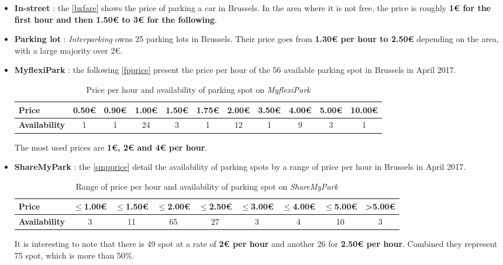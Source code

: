 \documentclass[12pt,a4paper,oneside]{book}
\begin{document}
\begin{itemize}
\item \textbf{In-street} : the \autoref{bxfare} shows the price of parking a car in Brussels. In the area where it is not free, the price is roughly \textbf{1\euro{} for the first hour and then 1.50\euro{} to 3\euro{} for the following}.
\item \textbf{Parking lot} : \textit{Interparking} owns 25 parking lots in Brussels. Their price goes from \textbf{1.30\euro{} per hour to 2.50\euro{}} depending on the area, with a large majority over 2\euro{}.\cite{interpk}
\item \textbf{MyflexiPark} : the following \autoref{fpprice} present the price per hour of the 56 available parking spot in Brussels in April 2017.

\begin{table}[h]
\centering
\caption{Price per hour and availability of parking spot on \textit{MyflexiPark}}
\label{fpprice}
\begin{adjustbox}{center}
\begin{tabular}{@{}lcccccccccc@{}}
\toprule
\textbf{Price}  & 0.50\euro{} & 0.90\euro{} & 1.00\euro{} & 1.50\euro{} & 1.75\euro{} & 2.00\euro{} & 3.50\euro{} & 4.00\euro{} & 5.00\euro{} & 10.00\euro{} \\ \midrule
\textbf{Availability} & 1           & 1           & 24          & 3           & 1           & 12          & 1           & 9           & 3           & 1            \\ \bottomrule
\end{tabular}
\end{adjustbox}
\end{table}

The most used prices are \textbf{1\euro{}, 2\euro{} and 4\euro{} per hour}.

\item \textbf{ShareMyPark} : the \autoref{smpprice} detail the availability of parking spots by a range of price per hour in Brussels in April 2017.

\begin{table}[h]
\centering
\caption{Range of price per hour and availability of parking spot on \textit{ShareMyPark}}
\label{smpprice}
\begin{adjustbox}{center}
\begin{tabular}{@{}lcccccccc@{}}
\toprule
\textbf{Price}       & $\leq$1.00\euro{} & $\leq$1.50\euro{} & $\leq$2.00\euro{} & $\leq$2.50\euro{} & $\leq$3.00\euro{} & $\leq$4.00\euro{} & $\leq$5.00\euro{} & >5.00\euro{} \\ \midrule
\textbf{Availability} & 3            & 11           & 65           & 27           & 3            & 4            & 10           & 3           \\\bottomrule
\end{tabular}
\end{adjustbox}
\end{table}

It is interesting to note that there is 49 spot at a rate of \textbf{2\euro{} per hour} and another 26 for \textbf{2.50\euro{} per hour}. Combined they represent 75 spot, which is more than 50\%.
\end{itemize}
\end{document}
